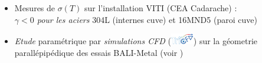 \begin{frame}[fragile]
\begin{itemize}
\begin{itemize}
    \end{itemize}
\item Mesures de $\sigma(T)$ sur l'installation VITI (CEA Cadarache) \cite{Chikhi2019} : \\ \emph{$\gamma<0$ pour les aciers} 304L (internes cuve) et 16MND5 (paroi cuve)
\item \emph{Etude} paramétrique par \emph{simulations CFD} (\includegraphics[width=1cm]{Figures/Logo_TrioCFD.eps}) sur la géometrie parallépipédique des essais BALI-Metal (voir \cite{Peybernes2019})
\end{itemize}
\end{frame}
\begin{frame}[fragile]


\end{frame}
